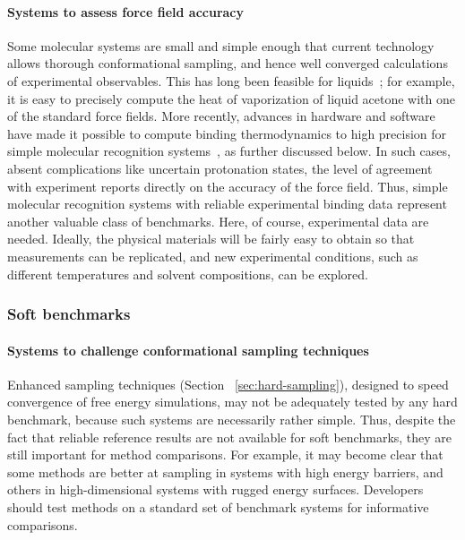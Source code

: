 \documentclass[aps,pre,twocolumn,nofootinbib,superscriptaddress,10pt, final,tightenlines]{revtex4-1}
\begin{document}
\paragraph{Systems to assess force field accuracy}
\label{pgph:accuracy}
Some molecular systems are small and simple enough that current technology allows thorough conformational sampling, and hence well converged calculations of experimental observables. 
This has long been feasible for liquids~\cite{jorgensen_quantum_1981}; for example, it is easy to precisely compute the heat of vaporization of liquid acetone with one of the standard force fields.
More recently, advances in hardware and software have made it possible to compute binding thermodynamics to high precision for
simple molecular recognition systems~\cite{henriksen_computational_2015}, as further discussed below. 
In such cases, absent complications like uncertain protonation states, the level of agreement with experiment reports directly on the accuracy of the force field.
Thus, simple molecular recognition systems with reliable experimental binding data represent another valuable class of benchmarks.
Here, of course, experimental data are needed. Ideally, the physical materials will be fairly easy to obtain so that measurements can be replicated, and new experimental conditions, such as different temperatures and solvent compositions, can be explored.

\subsubsection{Soft benchmarks}
\paragraph{Systems to challenge conformational sampling techniques}
Enhanced sampling techniques (Section ~\ref{sec:hard-sampling}), designed to speed convergence of free energy simulations,
may not be adequately tested by any hard benchmark, because such systems are necessarily rather simple. 
Thus, despite the fact that reliable reference results are not available for soft benchmarks, they are still important for method comparisons. 
For example, it may become clear that some methods are better at sampling in systems with high energy barriers, and others in high-dimensional systems with rugged energy surfaces. 
Developers should test methods on a standard set of benchmark systems for informative comparisons.
\end{document}
